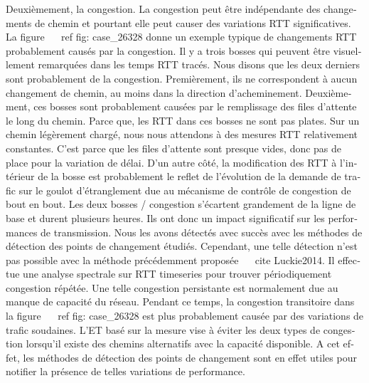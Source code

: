 \begin{otherlanguage}{french}
{{Deuxièmement, la congestion.
La congestion peut être indépendante des changements de chemin et pourtant elle peut causer des variations RTT significatives.
La figure ~ \ ref {fig: case_26328} donne un exemple typique de changements RTT probablement causés par la congestion.
Il y a trois bosses qui peuvent être visuellement remarquées dans les temps RTT tracés.
Nous disons que les deux derniers sont probablement de la congestion.
Premièrement, ils ne correspondent à aucun changement de chemin, au moins dans la direction d'acheminement.
Deuxièmement, ces bosses sont probablement causées par le remplissage des files d'attente le long du chemin.
Parce que, les RTT dans ces bosses ne sont pas plates.
Sur un chemin légèrement chargé, nous nous attendons à des mesures RTT relativement constantes.
C'est parce que les files d'attente sont presque vides, donc pas de place pour la variation de délai.
D'un autre côté, la modification des RTT à l'intérieur de la bosse est probablement le reflet de l'évolution de la demande de trafic sur le goulot d'étranglement due au mécanisme de contrôle de congestion de bout en bout.
Les deux bosses / congestion s'écartent grandement de la ligne de base et durent plusieurs heures.
Ils ont donc un impact significatif sur les performances de transmission.
Nous les avons détectés avec succès avec les méthodes de détection des points de changement étudiés.
Cependant, une telle détection n'est pas possible avec la méthode précédemment proposée ~ \ cite {Luckie2014}.
Il effectue une analyse spectrale sur RTT timeseries pour trouver périodiquement congestion répétée.
Une telle congestion persistante est normalement due au manque de capacité du réseau.
Pendant ce temps, la congestion transitoire dans la figure ~ \ ref {fig: case_26328} est plus probablement causée par des variations de trafic soudaines.
L'ET basé sur la mesure vise à éviter les deux types de congestion lorsqu'il existe des chemins alternatifs avec la capacité disponible.
A cet effet, les méthodes de détection des points de changement sont en effet utiles pour notifier la présence de telles variations de performance.

}}
\end{otherlanguage}

